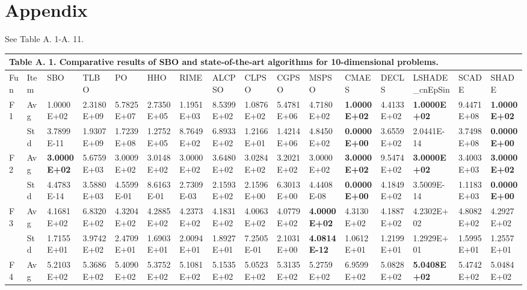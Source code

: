\documentclass{article} %
\begin{document}
\noindent 

\noindent 
\section{Appendix}

 See Table A. 1-A. 11.

\begin{tabular}{|p{0.3in}|p{0.3in}|p{0.3in}|p{0.3in}|p{0.3in}|p{0.3in}|p{0.3in}|p{0.3in}|p{0.3in}|p{0.3in}|p{0.3in}|p{0.3in}|p{0.3in}|p{0.3in}|p{0.3in}|p{0.5in}|} \hline 
\multicolumn{16}{|p{4.8in}|}{\textbf{Table A. }1\textbf{. }Comparative results of SBO and state-of-the-art algorithms for 10-dimensional problems.\textbf{}} \\ \hline 
Fun & Item & SBO & TLBO & PO & HHO & RIME & ALCPSO & CLPSO & CGPSO & MSPSO & CMAES & DECLS & LSHADE\_cnEpSin & SCADE & SHADE \\ \hline 
F1 & Avg & 1.0000E+02 & 2.3180E+09 & 5.7825E+07 & 2.7350E+05 & 1.1951E+03 & 8.5399E+02 & 1.0876E+02 & 5.4781E+06 & 4.7180E+02 & \textbf{1.0000E+02} & 4.4133E+02 & \textbf{1.0000E+02} & 9.4471E+08 & \textbf{1.0000E+02} \\ \hline 
 & Std & 3.7899E-11 & 1.9307E+09 & 1.7239E+08 & 1.2752E+05 & 8.7649E+02 & 6.8933E+02 & 1.2166E+01 & 1.4214E+06 & 4.8450E+02 & \textbf{0.0000E+00} & 3.6559E+02 & 2.0441E-14 & 3.7498E+08 & \textbf{0.0000E+00} \\ \hline 
F2 & Avg & \textbf{3.0000E+02} & 5.6759E+03 & 3.0009E+02 & 3.0148E+02 & 3.0000E+02 & 3.6480E+02 & 3.0284E+02 & 3.2021E+02 & 3.0000E+02 & \textbf{3.0000E+02} & 9.5474E+02 & \textbf{3.0000E+02} & 3.4003E+03 & \textbf{3.0000E+02} \\ \hline 
 & Std & 4.4783E-14 & 3.5880E+03 & 4.5599E-01 & 8.6163E-01 & 2.7309E-03 & 2.1593E+02 & 2.1596E+00 & 6.3013E+00 & 4.4408E-08 & \textbf{0.0000E+00} & 4.1849E+02 & 3.5009E-14 & 1.1183E+03 & \textbf{0.0000E+00} \\ \hline 
F3 & Avg & 4.1681E+02 & 6.8320E+02 & 4.3204E+02 & 4.2885E+02 & 4.2373E+02 & 4.1831E+02 & 4.0063E+02 & 4.0779E+02 & \textbf{4.0000E+02} & 4.3130E+02 & 4.1887E+02 & 4.2302E+02 & 4.8082E+02 & 4.2927E+02 \\ \hline 
 & Std & 1.7155E+01 & 3.9742E+02 & 2.4709E+01 & 1.6903E+01 & 2.0094E+01 & 1.8927E+01 & 7.2505E-01 & 2.1031E+00 & \textbf{4.0814E-12} & 1.0612E+01 & 1.2199E+01 & 1.2929E+01 & 1.5995E+01 & 1.2557E+01 \\ \hline 
F4 & Avg & 5.2103E+02 & 5.3686E+02 & 5.4090E+02 & 5.3752E+02 & 5.1081E+02 & 5.1535E+02 & 5.0523E+02 & 5.3135E+02 & 5.2759E+02 & 6.9599E+02 & 5.0828E+02 & \textbf{5.0408E+02} & 5.4742E+02 & 5.0484E+02 \\ \hline 

\end{tabular}
\end{document}
